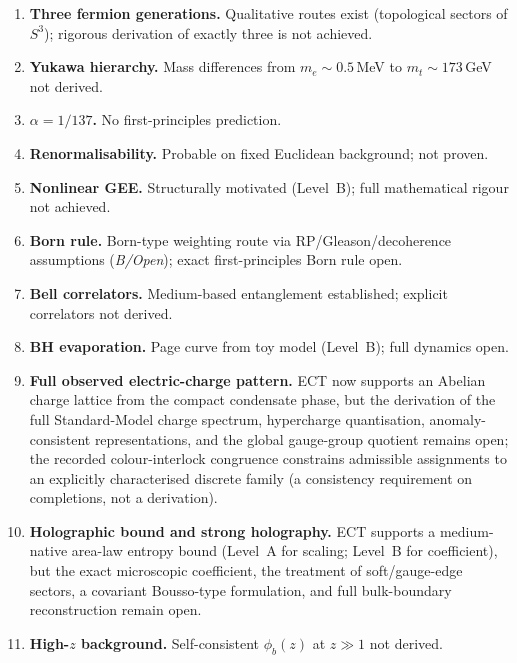\documentclass[11pt,a4paper]{article}
\begin{document}
\begin{enumerate}
\item \textbf{Three fermion generations.} Qualitative routes exist (topological sectors of $S^3$); rigorous derivation of exactly three is not achieved.

\item \textbf{Yukawa hierarchy.} Mass differences from $m_e \sim 0.5$\,MeV to $m_t \sim 173$\,GeV not derived.

\item \textbf{$\alpha = 1/137$.} No first-principles prediction.

\item \textbf{Renormalisability.} Probable on fixed Euclidean background; not proven.

\item \textbf{Nonlinear GEE.} Structurally motivated (Level~B); full mathematical rigour not achieved.

\item \textbf{Born rule.} Born-type weighting route via RP/Gleason/decoherence assumptions (\emph{B/Open}); exact first-principles Born rule open.

\item \textbf{Bell correlators.} Medium-based entanglement established; explicit correlators not derived.

\item \textbf{BH evaporation.} Page curve from toy model (Level~B); full dynamics open.

\item \textbf{Full observed electric-charge pattern.} ECT now supports an Abelian charge lattice from the compact condensate phase, but the derivation of the full Standard-Model charge spectrum, hypercharge quantisation, anomaly-consistent representations, and the global gauge-group quotient remains open; the recorded colour-interlock congruence constrains admissible assignments to an explicitly characterised discrete family (a consistency requirement on completions, not a derivation).

\item \textbf{Holographic bound and strong holography.} ECT supports a medium-native area-law entropy bound (Level~A for scaling; Level~B for coefficient), but the exact microscopic coefficient, the treatment of soft/gauge-edge sectors, a covariant Bousso-type formulation, and full bulk-boundary reconstruction remain open.

\item \textbf{High-$z$ background.} Self-consistent $\phi_b(z)$ at $z \gg 1$ not derived.


\end{enumerate}
\end{document}

